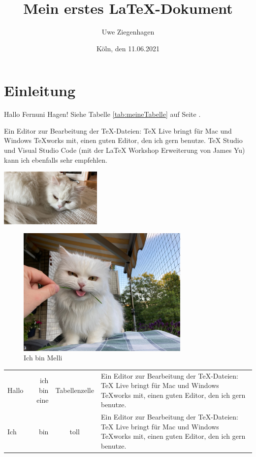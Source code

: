 \documentclass[ngerman,12pt]{scrartcl}
\title{Mein erstes \LaTeX-Dokument}
\author{Uwe Ziegenhagen}
\date{Köln, den 11.06.2021}
\begin{document}
\maketitle

\tableofcontents

\listoffigures

\listoftables

\section{Einleitung}

Hallo Fernuni Hagen! Siehe Tabelle \ref{tab:meineTabelle} auf Seite \pageref{tab:meineTabelle}.

Ein Editor zur Bearbeitung der TeX-Dateien: TeX Live bringt für Mac und Windows TeXworks mit, einen guten Editor, den ich gern benutze. 
TeX Studio und Visual Studio Code (mit der LaTeX Workshop Erweiterung von James Yu) kann ich ebenfalls sehr empfehlen.

\includegraphics[width=5cm]{Bilder/miau}


\begin{figure}[t] %
\centering
\includegraphics[width=0.75\textwidth]{Bilder/melli} %
\caption{Ich bin Melli}\label{fig:melli2}
\end{figure}


\blindtext 

\begin{tabular}{lrcp{5cm}}
Hallo & ich bin eine & Tabellenzelle & Ein Editor zur Be\-ar\-beitung der TeX-Dateien: TeX Live bringt für Mac und Windows TeXworks mit, einen guten Editor, den ich gern benutze.  \\
Ich & bin & toll & Ein Editor zur Bearbeitung der TeX-Dateien: TeX Live bringt für Mac und Windows TeXworks mit, einen guten Editor, den ich gern benutze.  \\
\end{tabular}
\end{document}
